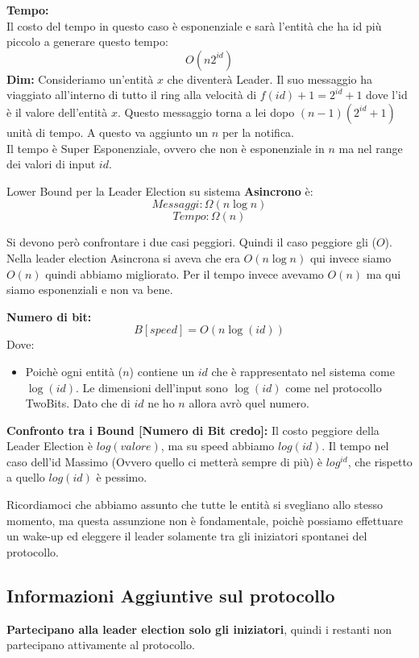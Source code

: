 \textbf{Tempo:}\\
Il costo del tempo in questo caso è esponenziale e sarà l'entità che ha id più piccolo a generare questo tempo: $$O(n 2^{id})$$
\textbf{Dim:} Consideriamo un'entità $x$ che diventerà Leader. Il suo messaggio ha viaggiato all'interno di tutto il ring alla velocità di $f(id)+1 = 2^{id}+1$ dove l'id è il valore dell'entità $x$. Questo messaggio torna a lei dopo $(n-1)(2^{id}+1)$ unità di tempo. A questo va aggiunto un $n$ per la notifica.\\
Il tempo è Super Esponenziale, ovvero che non è esponenziale in $n$ ma nel range dei valori di input $id$.\\

\begin{center}
    Lower Bound per la Leader Election su sistema \textbf{Asincrono} è:
    $$Messaggi: \Omega(n \log n) $$ $$Tempo: \Omega(n)$$
\end{center}

Si devono però confrontare i due casi peggiori. Quindi il caso peggiore gli ($O$). Nella leader election Asincrona si aveva che era $O(n \log n)$ qui invece siamo $O(n)$ quindi abbiamo migliorato. Per il tempo invece avevamo $O(n)$ ma qui siamo esponenziali e non va bene.

\textbf{Numero di bit:} $$B[speed] = O(n \log(id))$$
Dove:
\begin{itemize}
    \item Poichè ogni entità ($n$) contiene un $id$ che è rappresentato nel sistema come $\log(id)$. Le dimensioni dell'input sono $\log(id)$ come nel protocollo TwoBits. Dato che di $id$ ne ho $n$ allora avrò quel numero. 
\end{itemize}

\textbf{Confronto tra i Bound [Numero di Bit credo]:}
Il costo peggiore della Leader Election è $log(valore)$, ma su speed abbiamo $log(id)$. Il tempo nel caso dell'id Massimo (Ovvero quello ci metterà sempre di più) è $log^{id}$, che rispetto a quello $log(id)$ è pessimo.


Ricordiamoci che abbiamo assunto che tutte le entità si svegliano allo stesso momento, ma questa assunzione non è fondamentale, poichè possiamo effettuare un wake-up ed eleggere il leader solamente tra gli iniziatori spontanei del protocollo.

\subsection{Informazioni Aggiuntive sul protocollo}
 \textbf{Partecipano alla leader election solo gli iniziatori}, quindi i restanti non partecipano attivamente al protocollo.
 
